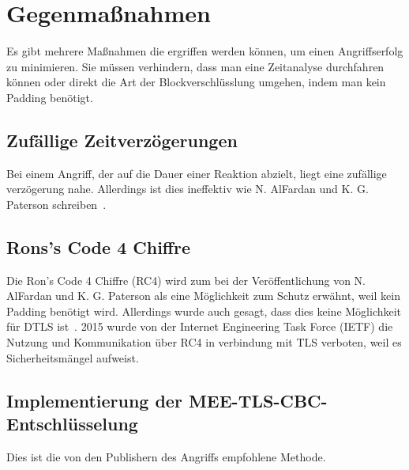 \documentclass[a4paper,10pt]{scrartcl}
\begin{document}
    \section{Gegenmaßnahmen}\label{sec:gegenmanahmen}
    Es gibt mehrere Maßnahmen die ergriffen werden können, um einen Angriffserfolg zu minimieren.
    Sie müssen verhindern, dass man eine Zeitanalyse durchfahren können oder direkt die Art der Blockverschlüsslung umgehen, indem man kein Padding benötigt.

    \subsection{Zufällige Zeitverzögerungen}\label{subsec:zufallige-zeitverzogerungen}
    Bei einem Angriff, der auf die Dauer einer Reaktion abzielt, liegt eine zufällige verzögerung nahe.
    Allerdings ist dies ineffektiv wie N. AlFardan und K. G. Paterson schreiben~\cite[S.13]{AlFardan2013}.

    \subsection{Rons's Code 4 Chiffre}\label{subsec:rons's-code-4-chiffre}
    Die Ron's Code 4 Chiffre (RC4) wird zum bei der Veröffentlichung von N. AlFardan und K. G. Paterson als eine Möglichkeit zum Schutz erwähnt, weil kein Padding benötigt wird.
    Allerdings wurde auch gesagt, dass dies keine Möglichkeit für DTLS ist~\cite[S.13]{AlFardan2013}.
    2015 wurde von der Internet Engineering Task Force (IETF)  die Nutzung und Kommunikation über RC4 in verbindung mit TLS verboten, weil es Sicherheitsmängel aufweist.

    \subsection{Implementierung der MEE-TLS-CBC-Entschlüsselung}
    Dies ist die von den Publishern des Angriffs empfohlene Methode.

    \newpage

    
\end{document}

